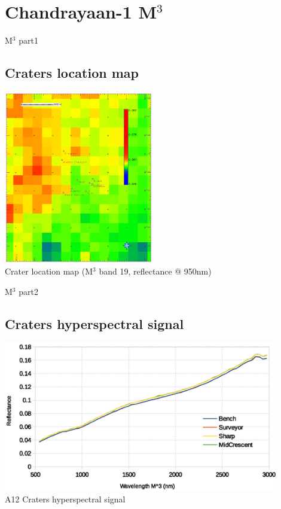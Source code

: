 \documentclass[unknownkeysallowed,xcolor=dvipsnames,beamer]{beamer} %
\begin{document}
\section{Chandrayaan-1 M$^3$}
\begin{frame}[fragile]{M$^3$ part1}
\subsection{Craters location map}
\begin{center}
  \includegraphics[width=6.5cm]{images/fig3}\\
  Crater location map (M$^3$ band 19, reflectance @ 950nm)
  \end{center}
\end{frame}
\begin{frame}[fragile]{M$^3$ part2}
\subsection{Craters hyperspectral signal}
\begin{center}
  \includegraphics[width=12cm]{images/fig4}\\
  A12 Craters hyperspectral signal
  \end{center}
\end{frame}
\end{document}
